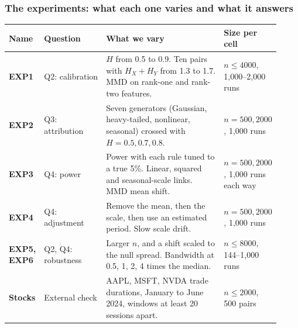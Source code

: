 \documentclass[11pt, aspectratio=169, xcolor={dvipsnames}]{beamer}
\begin{document}
\begin{frame}
\frametitle{The experiments: what each one varies and what it answers}
\footnotesize
\renewcommand{\arraystretch}{1.1}
\begin{tabular}{@{}>{\bfseries}p{0.075\linewidth}>{\raggedright}p{0.23\linewidth}>{\raggedright}p{0.44\linewidth}>{\raggedright\arraybackslash}p{0.17\linewidth}@{}}
\toprule
Name & Question & What we vary & Size per cell \\
\midrule
EXP1 & Q2: calibration & $H$ from 0.5 to 0.9. Ten pairs with $H_X+H_Y$ from 1.3 to 1.7. MMD on rank-one and rank-two features. & $n\le4000$, 1,000--2,000 runs \\
EXP2 & Q3: attribution & Seven generators (Gaussian, heavy-tailed, nonlinear, seasonal) crossed with $H=0.5, 0.7, 0.8$. & $n=500, 2000$, 1,000 runs \\
EXP3 & Q4: power & Power with each rule tuned to a true 5\%. Linear, squared and seasonal-scale links. MMD mean shift. & $n=500, 2000$, 1,000 runs each way \\
EXP4 & Q4: adjustment & Remove the mean, then the scale, then use an estimated period. Slow scale drift. & $n=500, 2000$, 1,000 runs \\
EXP5, EXP6 & Q2, Q4: robustness & Larger $n$, and a shift scaled to the null spread. Bandwidth at 0.5, 1, 2, 4 times the median. & $n\le8000$, 144--1,000 runs \\
Stocks & External check & AAPL, MSFT, NVDA trade durations, January to June 2024, windows at least 20 sessions apart. & $n\le2000$, 500 pairs \\
\bottomrule
\end{tabular}
\end{frame}
\end{document}
